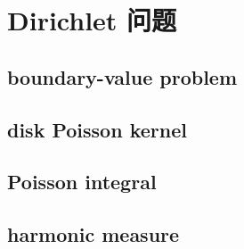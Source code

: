 \section{Dirichlet 问题}
\label{b3:sec:1601}


\subsection{boundary-value problem}
\label{b3:subsec:160101}

\subsection{disk Poisson kernel}
\label{b3:subsec:160102}

\subsection{Poisson integral}
\label{b3:subsec:160103}

\subsection{harmonic measure}
\label{b3:subsec:160104}


